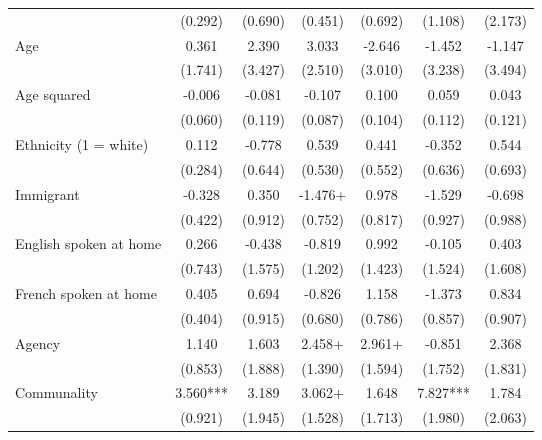 \documentclass[
  letterpaper,
  DIV=11,
  numbers=noendperiod]{scrreprt}
\begin{document}
\begin{table}
\begin{tabular}[t]{lcccccc}
\hspace{1em} & (0.292) & (0.690) & (0.451) & (0.692) & (1.108) & (2.173)\\
\hspace{1em}Age & 0.361 & 2.390 & 3.033 & -2.646 & -1.452 & -1.147\\
\hspace{1em} & (1.741) & (3.427) & (2.510) & (3.010) & (3.238) & (3.494)\\
\hspace{1em}Age squared & -0.006 & -0.081 & -0.107 & 0.100 & 0.059 & 0.043\\
\hspace{1em} & (0.060) & (0.119) & (0.087) & (0.104) & (0.112) & (0.121)\\
\hspace{1em}Ethnicity (1 = white) & 0.112 & -0.778 & 0.539 & 0.441 & -0.352 & 0.544\\
\hspace{1em} & (0.284) & (0.644) & (0.530) & (0.552) & (0.636) & (0.693)\\
\hspace{1em}Immigrant & -0.328 & 0.350 & -1.476+ & 0.978 & -1.529 & -0.698\\
\hspace{1em} & (0.422) & (0.912) & (0.752) & (0.817) & (0.927) & (0.988)\\
\hspace{1em}English spoken at home & 0.266 & -0.438 & -0.819 & 0.992 & -0.105 & 0.403\\
\hspace{1em} & (0.743) & (1.575) & (1.202) & (1.423) & (1.524) & (1.608)\\
\hspace{1em}French spoken at home & 0.405 & 0.694 & -0.826 & 1.158 & -1.373 & 0.834\\
\hspace{1em} & (0.404) & (0.915) & (0.680) & (0.786) & (0.857) & (0.907)\\
\hspace{1em}Agency & 1.140 & 1.603 & 2.458+ & 2.961+ & -0.851 & 2.368\\
\hspace{1em} & (0.853) & (1.888) & (1.390) & (1.594) & (1.752) & (1.831)\\
\hspace{1em}Communality & 3.560*** & 3.189 & 3.062+ & 1.648 & 7.827*** & 1.784\\
\hspace{1em} & (0.921) & (1.945) & (1.528) & (1.713) & (1.980) & (2.063)\\

\end{tabular}
\end{table}
\end{document}
